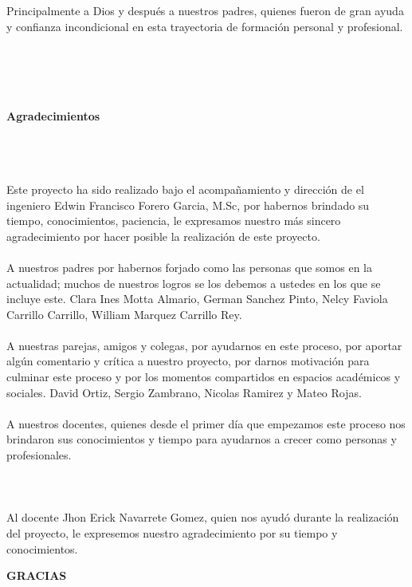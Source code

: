 \begin{flushright}
\begin{minipage}{8cm}
    \noindent
        \small
		Principalmente a Dios y después a nuestros padres, quienes fueron de gran ayuda y confianza incondicional en esta trayectoria de formación personal y profesional.  \\[4.0cm]\\
        
\end{minipage}
\end{flushright}


\newpage{\clearpage}
\thispagestyle{empty} \textbf{}\normalsize
\\\\\\%
\textbf{\LARGE Agradecimientos}
\setcounter{page}{5}
\\\\\\
Este proyecto ha sido realizado bajo el acompañamiento y dirección de el ingeniero Edwin Francisco Forero Garcia, M.Sc, por habernos brindado su tiempo, conocimientos, paciencia, le expresamos nuestro más sincero agradecimiento por hacer posible la realización de este proyecto.\\\\
A nuestros padres por habernos forjado como las personas que somos en la actualidad; muchos de nuestros logros se los debemos a ustedes en los que se incluye este. Clara Ines Motta Almario, German Sanchez Pinto, Nelcy Faviola Carrillo Carrillo, William Marquez Carrillo Rey.  \\\\
A nuestras parejas, amigos y colegas, por ayudarnos en este proceso, por aportar algún comentario y crítica a nuestro proyecto, por darnos motivación para culminar este proceso y por los momentos compartidos en espacios académicos y sociales. David Ortiz, Sergio Zambrano, Nicolas Ramirez y Mateo Rojas.  \\\\
A nuestros docentes, quienes desde el primer día que empezamos este proceso nos brindaron sus conocimientos y tiempo para ayudarnos a crecer como personas y profesionales.\\\\\\\\
Al docente Jhon Erick Navarrete Gomez, quien nos ayudó durante la realización del proyecto, le expresemos nuestro agradecimiento por su tiempo y conocimientos.
\begin{flushright}
\textbf{\large{ GRACIAS}}
\end{flushright}



